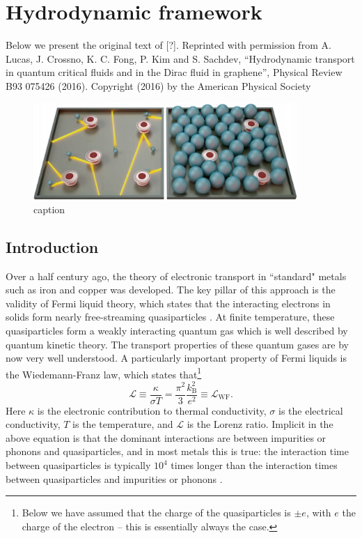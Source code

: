 \chapter{Hydrodynamic framework}
\label{Ch:hydrodynamic_framework}
Below we present the original text of [?]. Reprinted with permission from A. Lucas, J. Crossno, K. C. Fong, P. Kim and S. Sachdev, “Hydrodynamic transport in quantum critical fluids and in the Dirac fluid in graphene”, Physical Review B93 075426 (2016). Copyright (2016) by the American Physical Society
\begin{figure}
\centering
\includegraphics[width = 100mm]{figures/hydro_theory/cartoon_hydro.png}
\caption{caption}
\end{figure}

\section{Introduction}
Over a half century ago, the theory of electronic transport in ``standard" metals such as iron and copper was developed.  The key pillar of this approach is the validity of Fermi liquid theory, which states that the interacting electrons in solids form nearly free-streaming quasiparticles \cite{pines_theory_1994}.  At finite temperature, these quasiparticles form a weakly interacting quantum gas which is well described by quantum kinetic theory.   The transport properties of these quantum gases are by now very well understood.   A particularly important property of Fermi liquids is the Wiedemann-Franz law, which states that\footnote{Below we have assumed that the charge of the quasiparticles is $\pm e$, with $e$ the charge of the electron -- this is essentially always the case.} \begin{equation}
\mathcal{L} \equiv \frac{\kappa}{\sigma T} = \frac{\pi^2}{3} \frac{k_{\mathrm{B}}^2}{e^2} \equiv \mathcal{L}_{\mathrm{WF}}.
\end{equation}
Here $\kappa$ is the electronic contribution to thermal conductivity, $\sigma$ is the electrical conductivity, $T$ is the temperature, and $\mathcal{L}$ is the Lorenz ratio.   Implicit in the above equation is that the dominant interactions are between impurities or phonons and quasiparticles, and in most metals this is true:  the interaction time between quasiparticles is typically $10^4$ times longer than the interaction times between quasiparticles and impurities or phonons \cite{ashcroft_solid_1976}.   

